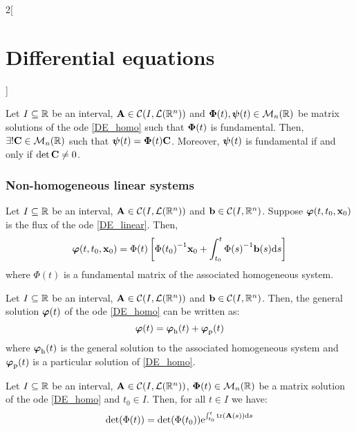 \documentclass[../../../main.tex]{subfiles}
\begin{document}
\begin{multicols}{2}[\section{Differential equations}]
\begin{prop}
\begin{enumerate}
    \end{enumerate}
  \end{prop}
  \begin{prop}
    Let $I\subseteq \mathbb{R}$ be an interval, $\boldsymbol{\mathrm{A}}\in\mathcal{C}(I,\mathcal{L}(\mathbb{R}^n))$ and $\boldsymbol{\mathrm{\Phi}}(t),\boldsymbol{\mathrm{\psi}}(t)\in\mathcal{M}_n(\mathbb{R})$ be matrix solutions of the ode \eqref{DE_homo} such that $\boldsymbol{\mathrm{\Phi}}(t)$ is fundamental. Then, $\exists! \boldsymbol{\mathrm{C}}\in\mathcal{M}_n(\mathbb{R})$ such that $\boldsymbol{\mathrm{\psi}}(t)=\boldsymbol{\mathrm{\Phi}}(t)\boldsymbol{\mathrm{C}}$. Moreover, $\boldsymbol{\mathrm{\psi}}(t)$ is fundamental if and only if $\det \boldsymbol{\mathrm{C}}\ne 0$.
  \end{prop}
  \subsubsection{Non-homogeneous linear systems}
  \begin{prop}
    Let $I\subseteq \mathbb{R}$ be an interval, $\boldsymbol{\mathrm{A}}\in\mathcal{C}(I,\mathcal{L}(\mathbb{R}^n))$ and $\boldsymbol{\mathrm{b}}\in\mathcal{C}(I,\mathbb{R}^n)$. Suppose $\boldsymbol{\mathrm{\varphi}}(t,t_0,\boldsymbol{\mathrm{x}}_0)$ is the flux of the ode \eqref{DE_linear}. Then, $$\boldsymbol{\mathrm{\varphi}}(t,t_0,\boldsymbol{\mathrm{x}}_0)=\Phi(t)\left[{\Phi(t_0)}^{-1}\boldsymbol{\mathrm{x}}_0+\int_{t_0}^t{\Phi(s)}^{-1}\boldsymbol{\mathrm{b}}(s)\dd s\right]$$ where $\Phi(t)$ is a fundamental matrix of the associated homogeneous system.
  \end{prop}
  \begin{corollary}
    Let $I\subseteq \mathbb{R}$ be an interval, $\boldsymbol{\mathrm{A}}\in\mathcal{C}(I,\mathcal{L}(\mathbb{R}^n))$ and $\boldsymbol{\mathrm{b}}\in\mathcal{C}(I,\mathbb{R}^n)$. Then, the general solution $\boldsymbol{\mathrm{\varphi}}(t)$ of the ode \eqref{DE_homo} can be written as: $$\boldsymbol{\mathrm{\varphi}}(t)=\boldsymbol{\mathrm{\varphi}}_\mathrm{h}(t)+\boldsymbol{\mathrm{\varphi}}_\mathrm{p}(t)$$ where $\boldsymbol{\mathrm{\varphi}}_\mathrm{h}(t)$ is the general solution to the associated homogeneous system and $\boldsymbol{\mathrm{\varphi}}_\mathrm{p}(t)$ is a particular solution of \eqref{DE_homo}.
  \end{corollary}
  \begin{prop}
    Let $I\subseteq \mathbb{R}$ be an interval, $\boldsymbol{\mathrm{A}}\in\mathcal{C}(I,\mathcal{L}(\mathbb{R}^n))$, $\boldsymbol{\mathrm{\Phi}}(t)\in\mathcal{M}_n(\mathbb{R})$ be a matrix solution of the ode \eqref{DE_homo} and $t_0\in I$. Then, for all $t\in I$ we have: $$\det(\Phi(t))=\det (\Phi(t_0))\exp{\int_{t_0}^t\trace(\vectorfunction{A}(s))\dd s}$$
  \end{prop}

\end{multicols}
\end{document}
